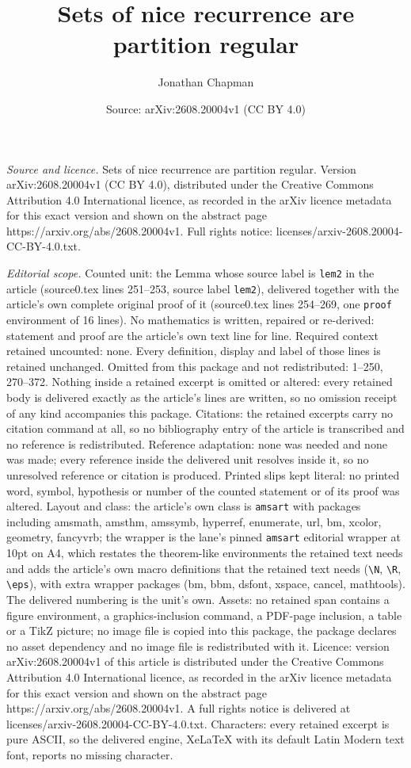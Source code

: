 \documentclass[10pt,a4paper]{amsart}
\title[Sets of nice recurrence are partition regular]{Sets of nice recurrence are partition regular}
\author{Jonathan Chapman}
\date{Source: arXiv:2608.20004v1 (CC BY 4.0)}
\begin{document}
\maketitle

\noindent\emph{Source and licence.} Sets of nice recurrence are partition regular. Version arXiv:2608.20004v1 (CC BY 4.0), distributed under the Creative Commons Attribution 4.0 International licence, as recorded in the arXiv licence metadata for this exact version and shown on the abstract page https://arxiv.org/abs/2608.20004v1. Full rights notice: licenses/arxiv-2608.20004-CC-BY-4.0.txt.\par\smallskip

\noindent\textit{Editorial scope.} Counted unit: the Lemma whose source label is \texttt{lem2} in the article (source0.tex lines 251--253, source label \texttt{lem2}), delivered together with the article's own complete original proof of it (source0.tex lines 254--269, one \texttt{proof} environment of 16 lines). No mathematics is written, repaired or re-derived: statement and proof are the article's own text line for line. Required context retained uncounted: none. Every definition, display and label of those lines is retained unchanged. Omitted from this package and not redistributed: 1--250, 270--372. Nothing inside a retained excerpt is omitted or altered: every retained body is delivered exactly as the article's lines are written, so no omission receipt of any kind accompanies this package. Citations: the retained excerpts carry no citation command at all, so no bibliography entry of the article is transcribed and no reference is redistributed. Reference adaptation: none was needed and none was made; every reference inside the delivered unit resolves inside it, so no unresolved reference or citation is produced. Printed slips kept literal: no printed word, symbol, hypothesis or number of the counted statement or of its proof was altered. Layout and class: the article's own class is \texttt{amsart} with packages including amsmath, amsthm, amssymb, hyperref, enumerate, url, bm, xcolor, geometry, fancyvrb; the wrapper is the lane's pinned \texttt{amsart} editorial wrapper at 10pt on A4, which restates the theorem-like environments the retained text needs and adds the article's own macro definitions that the retained text needs (\texttt{\textbackslash N}, \texttt{\textbackslash R}, \texttt{\textbackslash eps}), with extra wrapper packages (bm, bbm, dsfont, xspace, cancel, mathtools). The delivered numbering is the unit's own. Assets: no retained span contains a figure environment, a graphics-inclusion command, a PDF-page inclusion, a table or a TikZ picture; no image file is copied into this package, the package declares no asset dependency and no image file is redistributed with it. Licence: version arXiv:2608.20004v1 of this article is distributed under the Creative Commons Attribution 4.0 International licence, as recorded in the arXiv licence metadata for this exact version and shown on the abstract page https://arxiv.org/abs/2608.20004v1. A full rights notice is delivered at licenses/arxiv-2608.20004-CC-BY-4.0.txt. Characters: every retained excerpt is pure ASCII, so the delivered engine, XeLaTeX with its default Latin Modern text font, reports no missing character.
\end{document}
